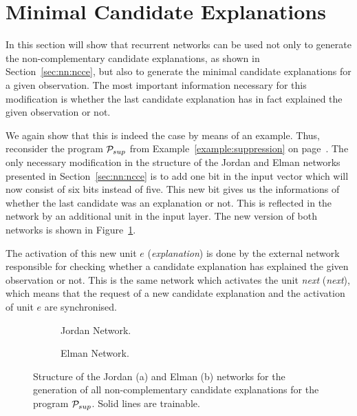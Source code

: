 \section{Minimal Candidate Explanations}
\label{sec:nn:mce}

In this section will show that recurrent networks can be used not only to generate the non-complementary candidate explanations, as shown in Section~\ref{sec:nn:ncce}, but also to generate the minimal candidate explanations for a given observation. The most important information necessary for this modification is whether the last candidate explanation has in fact explained the given observation or not.  

We again show that this is indeed the case by means of an example. Thus, reconsider the program $\mathcal{P}_{sup}$ from Example~\ref{example:suppression} on page~\pageref{example:suppression}. The only necessary modification in the structure of the Jordan and Elman networks presented in Section~\ref{sec:nn:ncce} is to add one bit in the input vector which will now consist of six bits instead of five. This new bit gives us the informations of whether the last candidate was an explanation or not. This is reflected in the network by an additional unit in the input layer. The new version of both networks is shown in Figure~\ref{fig:rnnmin}.

The activation of this new unit $e$ (\textit{explanation}) is done by the external network responsible for checking whether a candidate explanation has explained the given observation or not. This is the same network which activates the unit \textit{next} (\textit{next}), which means that the request of a new candidate explanation and the activation of unit $e$ are synchronised.

\begin{figure}
\centering
   \begin{subfigure}[b]{0.55\textwidth}
   \scalebox{0.7}{\jordanmin}
   \caption{Jordan Network.}
   \bigskip
\end{subfigure}
\begin{subfigure}[b]{0.55\textwidth}
   \scalebox{0.7}{\elmanmin}
   \caption{Elman Network.}
\end{subfigure}
\caption{Structure of the Jordan (a) and Elman (b) networks for the generation of all non-complementary candidate explanations for the program $\mathcal{P}_{sup}$. Solid lines are trainable.}
\label{fig:rnnmin}
\end{figure}

